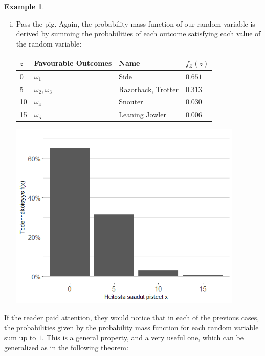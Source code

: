 \documentclass[12pt,a4paper,leqno]{report}
\theoremstyle{plain}
\theoremstyle{definition}
\newtheorem{esim}[equation]{Example}
\begin{document}
\begin{esim}
\begin{enumerate}[(i)]
\bigskip

\item Pass the pig. Again, the probability mass function of our random variable is derived by summing the probabilities of each outcome satisfying each value of the random variable:
\bigskip

\begin{tabular}{l L{4cm} l l}
\toprule
 $z$ & Favourable Outcomes & Name & $f_Z(z)$ \\
 & $\omega_1$ & Side & $0.651$ \\
5 & $\omega_2, \omega_3$ & Razorback, Trotter & $0.313$ \\
10 & $\omega_4$ & Snouter & $0.030$ \\ 
15 & $\omega_5$ & Leaning Jowler & $0.006$ \\ 
\bottomrule 
\end{tabular}

\begin{center}
\includegraphics[height = 9cm]{sika.png}
\end{center}

\bigskip

\end{enumerate}

\end{esim}

If the reader paid attention, they would notice that in each of the previous cases, the probabilities given by the probability mass function for each random variable sum up to $1.$ This is a general property, and a very useful one, which can be generalized as in the following theorem:
\end{document}
